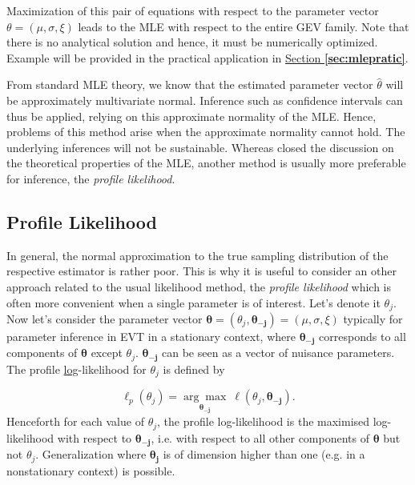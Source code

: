 Maximization of this pair of equations with respect to the parameter vector $\theta=(\mu,\sigma,\xi)$ leads to the MLE with respect to the entire GEV family. Note that there is no analytical solution and hence, it must be numerically optimized. Example will be provided in the practical application in \hyperref[sec:mlepratic]{Section \textbf{\ref{sec:mlepratic}}}.

From standard MLE theory, we know that the estimated parameter vector $\hat{\theta}$ will be approximately multivariate normal. Inference such as confidence intervals can thus be applied, relying on this approximate normality of the MLE. Hence, problems of this method arise when the approximate normality cannot hold. The underlying inferences will not be sustainable. Whereas \citet{zhou_extent_2010} closed the discussion on the theoretical properties of the MLE, another method is usually more preferable for inference, the \emph{profile likelihood}.


\subsection*{Profile Likelihood}

In general, the normal approximation to the true sampling distribution of the respective estimator is rather poor. This is why it is useful to consider an other approach related to the usual likelihood method, the \emph{profile likelihood} which is often more convenient when a single parameter is of interest. Let's denote it $\theta_j$. Now let's consider the parameter vector $\boldsymbol{\theta}=(\theta_j,\boldsymbol{\theta_{-j}})= (\mu,\sigma,\xi)$ typically for parameter inference in EVT in a stationary context, where $\boldsymbol{\theta_{-j}}$ corresponds to all components of $\boldsymbol{\theta}$ except $\theta_j$. $\boldsymbol{\theta_{-j}}$ can be seen as a vector of nuisance parameters.
The profile \underline{log}-likelihood for $\theta_j$ is defined by 

\begin{equation}
\ell_p(\theta_j)=\underset{\boldsymbol{\theta_{-j}}}{\mathrm{\arg\max}}\ \ell (\theta_j,\boldsymbol{\theta_{-j}}).
\end{equation}
Henceforth for each value of $\theta_j$, the profile log-likelihood is the maximised 
log-likelihood with respect to $\boldsymbol{\theta_{-j}}$, i.e. with respect to all other 
components of $\boldsymbol{\theta}$ but not $\theta_j$.
Generalization where $\boldsymbol{\theta_j}$ is of dimension higher than one (e.g. in a nonstationary context) is possible.

